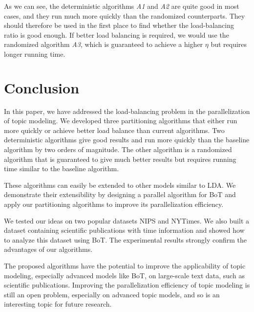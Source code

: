 \documentclass[10pt,conference]{IEEEtran}
\begin{document}
As we can see, the deterministic algorithms \textit{A1} and \textit{A2} are quite good in most cases, and they run much more quickly than the randomized counterparts. They should therefore be used in the first place to find whether the load-balancing ratio is good enough. If better load balancing is required, we would use the randomized algorithm \textit{A3}, which is guaranteed to achieve a higher $\eta$ but requires longer running time.
\section{Conclusion}
In this paper, we have addressed the load-balancing problem in the parallelization of topic modeling. We developed three partitioning algorithms that either run more quickly or achieve better load balance than current algorithms. Two deterministic algorithms give good results and run more quickly than the baseline algorithm by two orders of magnitude. The other algorithm is a randomized algorithm that is guaranteed to give much better results but requires running time similar to the baseline algorithm.

These algorithms can easily be extended to other models similar to LDA. We demonstrate their extensibility by designing a parallel algorithm for BoT and apply our partitioning algorithms to improve its parallelization efficiency.

We tested our ideas on two popular datasets NIPS and NYTimes. We also built a dataset containing scientific publications with time information and showed how to analyze this dataset using BoT. The experimental results strongly confirm the advantages of our algorithms.

The proposed algorithms have the potential to improve the applicability of topic modeling, especially advanced models like BoT, on large-scale text data, such as scientific publications. Improving the parallelization efficiency of topic modeling is still an open problem, especially on advanced topic models, and so is an interesting topic for future research.
\end{document}
